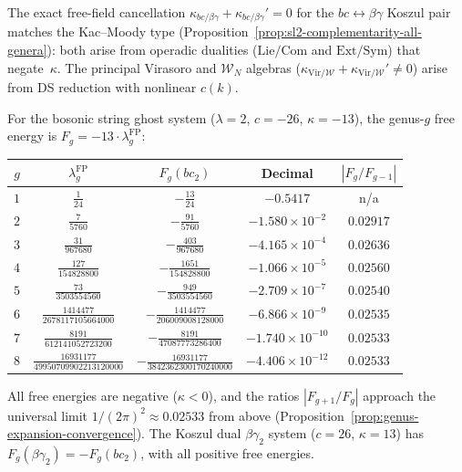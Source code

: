 \begin{remark}
\label{rem:fermion-complementarity-type}
The exact free-field cancellation $\kappa_{bc/\beta\gamma} + \kappa_{bc/\beta\gamma}' = 0$ for the $bc \leftrightarrow \beta\gamma$ Koszul pair matches the Kac--Moody type (Proposition~\ref{prop:sl2-complementarity-all-genera}): both arise from operadic dualities ($\mathrm{Lie}/\mathrm{Com}$ and $\mathrm{Ext}/\mathrm{Sym}$) that negate~$\kappa$. The principal Virasoro and $\mathcal{W}_N$ algebras ($\kappa_{\mathrm{Vir}/\mathcal{W}} + \kappa_{\mathrm{Vir}/\mathcal{W}}' \neq 0$) arise from DS reduction with nonlinear $c(k)$.
\end{remark}

\begin{computation}

\label{comp:bc-ghost-genus}
For the bosonic string ghost system ($\lambda = 2$,
$c = -26$, $\kappa = -13$), the genus-$g$ free energy
is $F_g = -13 \cdot \lambda_g^{\mathrm{FP}}$:

\medskip
\begin{center}
\renewcommand{\arraystretch}{1.3}
\begin{tabular}{ccccc}
\toprule
$g$ & $\lambda_g^{\mathrm{FP}}$ & $F_g(bc_2)$ & Decimal & $|F_g/F_{g-1}|$ \\
\midrule
$1$ & $\frac{1}{24}$ & $-\frac{13}{24}$ & $-0.5417$ & n/a \\[6pt]
$2$ & $\frac{7}{5760}$ & $-\frac{91}{5760}$ & $-1.580 \times 10^{-2}$ & $0.02917$ \\[6pt]
$3$ & $\frac{31}{967680}$ & $-\frac{403}{967680}$ & $-4.165 \times 10^{-4}$ & $0.02636$ \\[6pt]
$4$ & $\frac{127}{154828800}$ & $-\frac{1651}{154828800}$ & $-1.066 \times 10^{-5}$ & $0.02560$ \\[6pt]
$5$ & $\frac{73}{3503554560}$ & $-\frac{949}{3503554560}$ & $-2.709 \times 10^{-7}$ & $0.02540$ \\[6pt]
$6$ & $\frac{1414477}{2678117105664000}$ & $-\frac{1414477}{206009008128000}$ & $-6.866 \times 10^{-9}$ & $0.02535$ \\[6pt]
$7$ & $\frac{8191}{612141052723200}$ & $-\frac{8191}{47087773286400}$ & $-1.740 \times 10^{-10}$ & $0.02533$ \\[6pt]
$8$ & $\frac{16931177}{49950709902213120000}$ & $-\frac{16931177}{3842362300170240000}$ & $-4.406 \times 10^{-12}$ & $0.02533$ \\[4pt]
\bottomrule
\end{tabular}
\end{center}

\medskip
\noindent
All free energies are negative ($\kappa < 0$), and the ratios
$|F_{g+1}/F_g|$ approach the universal limit
$1/(2\pi)^2 \approx 0.02533$ from above
(Proposition~\ref{prop:genus-expansion-convergence}).
The Koszul dual $\beta\gamma_2$ system ($c = 26$, $\kappa = 13$)
has $F_g(\beta\gamma_2) = -F_g(bc_2)$, with all positive
free energies.
\end{computation}

